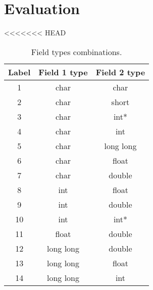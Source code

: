 \section{Evaluation}
\label{sec:eval}
<<<<<<< HEAD

\begin{table}[htb]
\centering
\begin{tabular}{ccc}
\toprule
Label & Field 1 type & Field 2 type \\
\midrule
1 & char & char \\
2 & char & short \\
3 & char & int* \\
4 & char & int \\
5 & char & long long \\
6 & char & float \\
7 & char & double \\
8 & int & float \\
9 & int & double \\
10 & int & int* \\
11 & float & double \\
12 & long long & double \\
13 & long long & float \\
14 & long long & int \\
\bottomrule
\end{tabular}
\caption{Field types combinations.}
\label{tbl:field-combinations}
\end{table}

